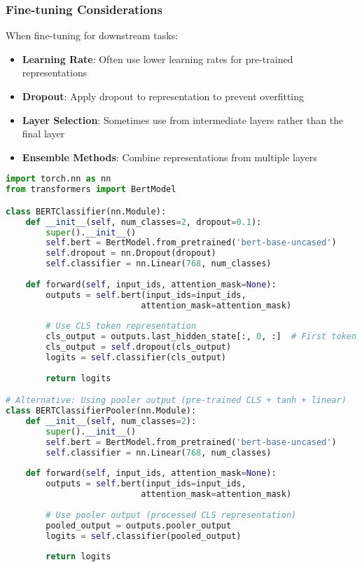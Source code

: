 \subsubsection{Fine-tuning Considerations}
When fine-tuning for downstream tasks:

\begin{itemize}
\item \textbf{Learning Rate}: Often use lower learning rates for pre-trained \cls{} representations
\item \textbf{Dropout}: Apply dropout to \cls{} representation to prevent overfitting
\item \textbf{Layer Selection}: Sometimes use \cls{} from intermediate layers rather than the final layer
\item \textbf{Ensemble Methods}: Combine \cls{} representations from multiple layers
\end{itemize}

\begin{lstlisting}[language=Python, caption=Fine-tuning CLS Token]
import torch.nn as nn
from transformers import BertModel

class BERTClassifier(nn.Module):
    def __init__(self, num_classes=2, dropout=0.1):
        super().__init__()
        self.bert = BertModel.from_pretrained('bert-base-uncased')
        self.dropout = nn.Dropout(dropout)
        self.classifier = nn.Linear(768, num_classes)
        
    def forward(self, input_ids, attention_mask=None):
        outputs = self.bert(input_ids=input_ids, 
                           attention_mask=attention_mask)
        
        # Use CLS token representation
        cls_output = outputs.last_hidden_state[:, 0, :]  # First token
        cls_output = self.dropout(cls_output)
        logits = self.classifier(cls_output)
        
        return logits

# Alternative: Using pooler output (pre-trained CLS + tanh + linear)
class BERTClassifierPooler(nn.Module):
    def __init__(self, num_classes=2):
        super().__init__()
        self.bert = BertModel.from_pretrained('bert-base-uncased')
        self.classifier = nn.Linear(768, num_classes)
        
    def forward(self, input_ids, attention_mask=None):
        outputs = self.bert(input_ids=input_ids, 
                           attention_mask=attention_mask)
        
        # Use pooler output (processed CLS representation)
        pooled_output = outputs.pooler_output
        logits = self.classifier(pooled_output)
        
        return logits
\end{lstlisting}

